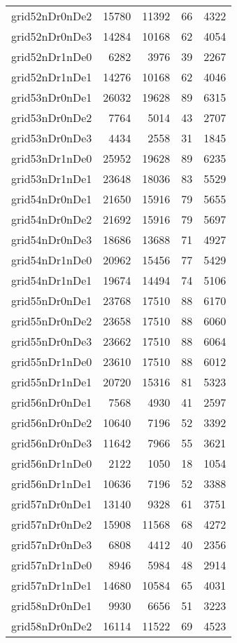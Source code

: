 \begin{tabular}{lrrrr}
grid52nDr0nDe2 & 15780 & 11392 & 66 & 4322 \\
grid52nDr0nDe3 & 14284 & 10168 & 62 & 4054 \\
grid52nDr1nDe0 & 6282 & 3976 & 39 & 2267 \\
grid52nDr1nDe1 & 14276 & 10168 & 62 & 4046 \\
grid53nDr0nDe1 & 26032 & 19628 & 89 & 6315 \\
grid53nDr0nDe2 & 7764 & 5014 & 43 & 2707 \\
grid53nDr0nDe3 & 4434 & 2558 & 31 & 1845 \\
grid53nDr1nDe0 & 25952 & 19628 & 89 & 6235 \\
grid53nDr1nDe1 & 23648 & 18036 & 83 & 5529 \\
grid54nDr0nDe1 & 21650 & 15916 & 79 & 5655 \\
grid54nDr0nDe2 & 21692 & 15916 & 79 & 5697 \\
grid54nDr0nDe3 & 18686 & 13688 & 71 & 4927 \\
grid54nDr1nDe0 & 20962 & 15456 & 77 & 5429 \\
grid54nDr1nDe1 & 19674 & 14494 & 74 & 5106 \\
grid55nDr0nDe1 & 23768 & 17510 & 88 & 6170 \\
grid55nDr0nDe2 & 23658 & 17510 & 88 & 6060 \\
grid55nDr0nDe3 & 23662 & 17510 & 88 & 6064 \\
grid55nDr1nDe0 & 23610 & 17510 & 88 & 6012 \\
grid55nDr1nDe1 & 20720 & 15316 & 81 & 5323 \\
grid56nDr0nDe1 & 7568 & 4930 & 41 & 2597 \\
grid56nDr0nDe2 & 10640 & 7196 & 52 & 3392 \\
grid56nDr0nDe3 & 11642 & 7966 & 55 & 3621 \\
grid56nDr1nDe0 & 2122 & 1050 & 18 & 1054 \\
grid56nDr1nDe1 & 10636 & 7196 & 52 & 3388 \\
grid57nDr0nDe1 & 13140 & 9328 & 61 & 3751 \\
grid57nDr0nDe2 & 15908 & 11568 & 68 & 4272 \\
grid57nDr0nDe3 & 6808 & 4412 & 40 & 2356 \\
grid57nDr1nDe0 & 8946 & 5984 & 48 & 2914 \\
grid57nDr1nDe1 & 14680 & 10584 & 65 & 4031 \\
grid58nDr0nDe1 & 9930 & 6656 & 51 & 3223 \\
grid58nDr0nDe2 & 16114 & 11522 & 69 & 4523 \\

\end{tabular}
